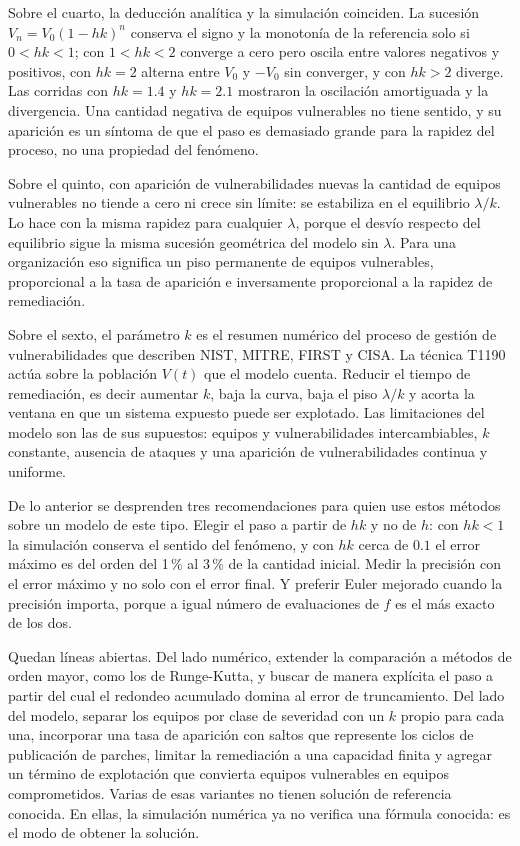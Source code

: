 Sobre el cuarto, la deducción analítica y la simulación coinciden. La sucesión
$V_n = V_0 (1 - hk)^n$ conserva el signo y la monotonía de la referencia solo si $0 < hk < 1$;
con $1 < hk < 2$ converge a cero pero oscila entre valores negativos y positivos, con $hk = 2$
alterna entre $V_0$ y $-V_0$ sin converger, y con $hk > 2$ diverge. Las corridas con $hk = 1.4$
y $hk = 2.1$ mostraron la oscilación amortiguada y la divergencia. Una
cantidad negativa de equipos vulnerables no tiene sentido, y su aparición es un síntoma de que
el paso es demasiado grande para la rapidez del proceso, no una propiedad del fenómeno.

Sobre el quinto, con aparición de vulnerabilidades nuevas la cantidad de equipos vulnerables no
tiende a cero ni crece sin límite: se estabiliza en el equilibrio $\lambda/k$. Lo hace con la
misma rapidez para cualquier $\lambda$, porque el desvío respecto del equilibrio sigue la misma
sucesión geométrica del modelo sin $\lambda$. Para una organización eso significa un piso
permanente de equipos vulnerables, proporcional a la tasa de aparición e inversamente
proporcional a la rapidez de remediación.

Sobre el sexto, el parámetro $k$ es el resumen numérico del proceso de gestión de
vulnerabilidades que describen NIST, MITRE, FIRST y CISA. La técnica T1190 actúa sobre la
población $V(t)$ que el modelo cuenta. Reducir el tiempo de remediación, es decir aumentar $k$,
baja la curva, baja el piso $\lambda/k$ y acorta la ventana en que un sistema expuesto puede
ser explotado. Las limitaciones del modelo son las de sus supuestos: equipos y vulnerabilidades
intercambiables, $k$ constante, ausencia de ataques y una aparición de vulnerabilidades continua
y uniforme.

De lo anterior se desprenden tres recomendaciones para quien use estos métodos sobre un modelo
de este tipo. Elegir el paso a partir de $hk$ y no de $h$: con $hk < 1$ la simulación conserva
el sentido del fenómeno, y con $hk$ cerca de $0.1$ el error máximo es del orden del 1\,\% al
3\,\% de la cantidad inicial.
Medir la precisión con el error máximo y no solo con el error final. Y preferir Euler mejorado
cuando la precisión importa, porque a igual número de evaluaciones de $f$ es el más exacto de
los dos.

Quedan líneas abiertas. Del lado numérico, extender la comparación a métodos de orden mayor,
como los de Runge-Kutta, y buscar de manera explícita el paso a partir del cual el redondeo
acumulado domina al error de truncamiento. Del lado del modelo, separar los equipos por clase de
severidad con un $k$ propio para cada una, incorporar una tasa de aparición con saltos que
represente los ciclos de publicación de parches, limitar la remediación a una capacidad finita
y agregar un término de explotación que convierta equipos vulnerables en equipos comprometidos.
Varias de esas variantes no tienen solución de referencia conocida. En ellas, la simulación
numérica ya no verifica una fórmula conocida: es el modo de obtener la solución.
